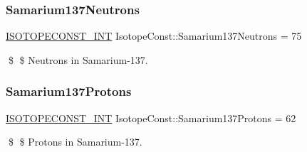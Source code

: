 \subsubsection{\texorpdfstring{Samarium137\+Neutrons}{Samarium137Neutrons}}
{\footnotesize\ttfamily \mbox{\hyperlink{group___isotope_const-_macros_ga5f18360b3e99483a35c32d789e62621c}{I\+S\+O\+T\+O\+P\+E\+C\+O\+N\+S\+T\+\_\+\+I\+NT}} Isotope\+Const\+::\+Samarium137\+Neutrons = 75}

\$ \$ Neutrons in Samarium-\/137. \mbox{\label{group___isotope_const-_samarium-_sm137_ga8b553873ebb3d4ea080cf3ed547669a7}} 
\subsubsection{\texorpdfstring{Samarium137\+Protons}{Samarium137Protons}}
{\footnotesize\ttfamily \mbox{\hyperlink{group___isotope_const-_macros_ga5f18360b3e99483a35c32d789e62621c}{I\+S\+O\+T\+O\+P\+E\+C\+O\+N\+S\+T\+\_\+\+I\+NT}} Isotope\+Const\+::\+Samarium137\+Protons = 62}

\$ \$ Protons in Samarium-\/137. 